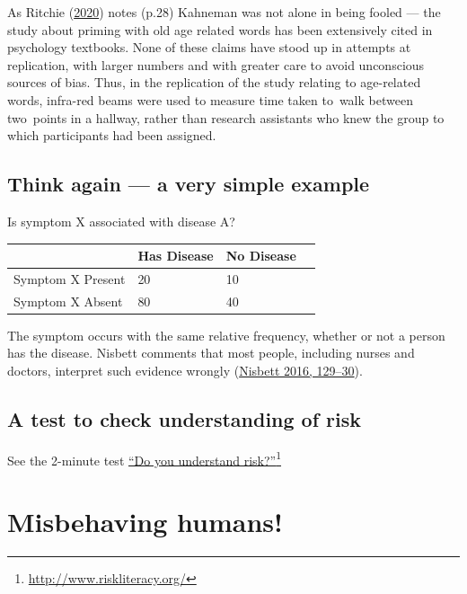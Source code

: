 \documentclass[
  10pt,
  b5paper]{book}
\begin{document}
As Ritchie (\protect\hyperlink{ref-ritchie2020science}{2020}) notes (p.28) Kahneman was not alone in being fooled --- the study about priming with old age related words has been extensively cited in psychology textbooks. None of these claims have stood up in attempts at replication, with larger numbers and with greater care to avoid unconscious sources of bias. Thus, in the replication of the study relating to age-related words, infra-red beams were used to measure time taken to~walk between two~points in a hallway, rather than research assistants who knew the group to which participants had been assigned.

\hypertarget{think-again-a-very-simple-example}{%
\subsection*{Think again --- a very simple example}\label{think-again-a-very-simple-example}}

Is symptom X associated with disease A?

\begin{longtable}[]{@{}llll@{}}
\toprule\noalign{}
& Has Disease & No Disease & \\
\midrule\noalign{}
\endhead
\bottomrule\noalign{}
\endlastfoot
Symptom X Present & 20 & 10 & \\
Symptom X Absent & 80 & 40 & \\
\end{longtable}

The symptom occurs with the same relative frequency, whether or not a person has the disease. Nisbett comments that most people, including nurses and doctors, interpret such evidence wrongly (\protect\hyperlink{ref-nisbett}{Nisbett 2016, 129--30}).

\hypertarget{a-test-to-check-understanding-of-risk}{%
\subsection*{A test to check understanding of risk}\label{a-test-to-check-understanding-of-risk}}

See the 2-minute test \href{http://www.riskliteracy.org/}{``Do you understand risk?''}\footnote{\url{http://www.riskliteracy.org/}}

\hypertarget{misbehaving-humans}{%
\section{Misbehaving humans!}\label{misbehaving-humans}}
\end{document}
